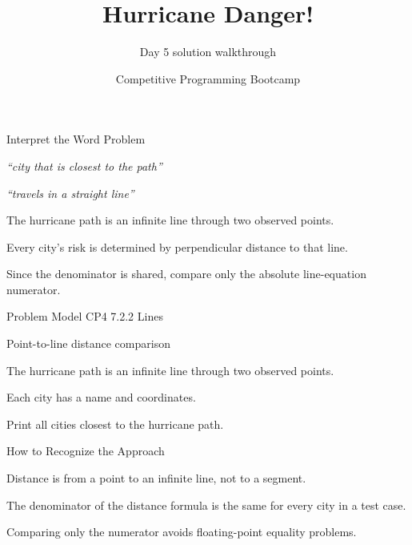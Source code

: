 \documentclass[aspectratio=169,11pt]{beamer}
\title[hurricanedanger]{Hurricane Danger!}
\subtitle{Day 5 solution walkthrough}
\author[Solution Deck]{Competitive Programming Bootcamp}
\date{}
\begin{document}
\begin{frame}[plain]
  \titlepage
\end{frame}

\begin{frame}{Interpret the Word Problem}
\small
{}
\begin{tightitemize}
  \item \textit{``city that is closest to the path''}
  \item \textit{``travels in a straight line''}
\end{tightitemize}

\vspace{0.18cm}
\begin{tightitemize}
  \item The hurricane path is an infinite line through two observed points.
  \item Every city's risk is determined by perpendicular distance to that line.
  \item Since the denominator is shared, compare only the absolute line-equation numerator.
\end{tightitemize}
\end{frame}







\begin{frame}{Problem Model}
\small
{} CP4 7.2.2 Lines

\vspace{0.25cm}
 Point-to-line distance comparison

\vspace{0.25cm}
\begin{tightitemize}
  \item The hurricane path is an infinite line through two observed points.
  \item Each city has a name and coordinates.
  \item Print all cities closest to the hurricane path.
\end{tightitemize}
\end{frame}

\begin{frame}{How to Recognize the Approach}
\begin{tightitemize}
  \item Distance is from a point to an infinite line, not to a segment.
  \item The denominator of the distance formula is the same for every city in a test case.
  \item Comparing only the numerator avoids floating-point equality problems.
\end{tightitemize}
\end{frame}
\end{document}
